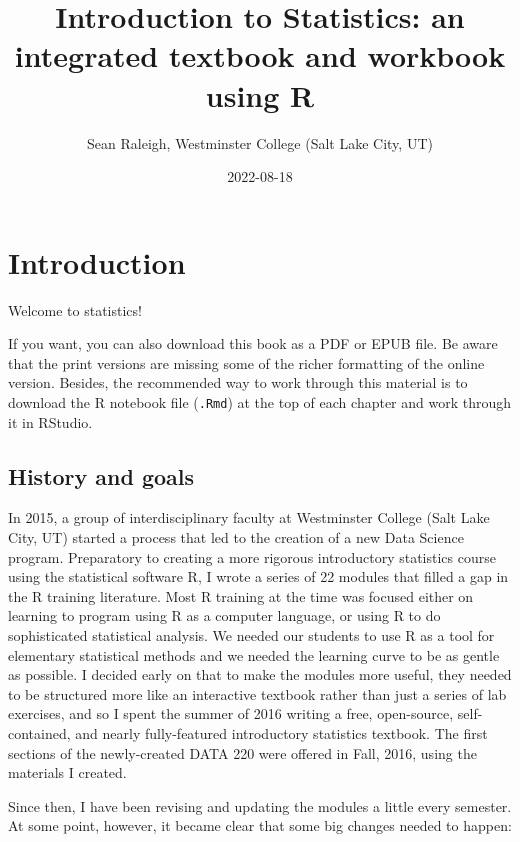 \documentclass[
]{book}
\title{Introduction to Statistics: an integrated textbook and workbook using R}
\author{Sean Raleigh, Westminster College (Salt Lake City, UT)}
\date{2022-08-18}
\begin{document}
\maketitle

{
\setcounter{tocdepth}{1}
\tableofcontents
}
\hypertarget{intro}{%
\chapter*{Introduction}\label{intro}}

Welcome to statistics!

If you want, you can also download this book as a PDF or EPUB file. Be aware that the print versions are missing some of the richer formatting of the online version. Besides, the recommended way to work through this material is to download the R notebook file (\texttt{.Rmd}) at the top of each chapter and work through it in RStudio.

\hypertarget{intro-history}{%
\section*{History and goals}\label{intro-history}}

In 2015, a group of interdisciplinary faculty at Westminster College (Salt Lake City, UT) started a process that led to the creation of a new Data Science program. Preparatory to creating a more rigorous introductory statistics course using the statistical software R, I wrote a series of 22 modules that filled a gap in the R training literature. Most R training at the time was focused either on learning to program using R as a computer language, or using R to do sophisticated statistical analysis. We needed our students to use R as a tool for elementary statistical methods and we needed the learning curve to be as gentle as possible. I decided early on that to make the modules more useful, they needed to be structured more like an interactive textbook rather than just a series of lab exercises, and so I spent the summer of 2016 writing a free, open-source, self-contained, and nearly fully-featured introductory statistics textbook. The first sections of the newly-created DATA 220 were offered in Fall, 2016, using the materials I created.

Since then, I have been revising and updating the modules a little every semester. At some point, however, it became clear that some big changes needed to happen:
\end{document}
